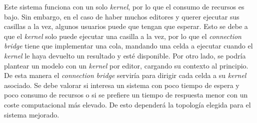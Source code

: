 \documentclass[11pt,spanish,listoffigures]{tfgetsinf}
\begin{document}
Este sistema funciona con un solo \textit{kernel}, por lo que el consumo de recursos es bajo. Sin embargo, en el caso de haber muchos editores y querer ejecutar sus casillas a la vez, algunos usuarios puede que tengan que esperar. Esto se debe a que el \textit{kernel} solo puede ejecutar una casilla a la vez, por lo que el \textit{connection bridge} tiene que implementar una cola, mandando una celda a ejecutar cuando el \textit{kernel} le haya devuelto un resultado y esté disponible. Por otro lado, se podría plantear un modelo con un \textit{kernel} por editor, cargando su contexto al principio. De esta manera el \textit{connection bridge} serviría para dirigir cada celda a su \textit{kernel} asociado. Se debe valorar si interesa un sistema con poco tiempo de espera y poco consumo de recursos o si se prefiere un tiempo de respuesta menor con un coste computacional más elevado. De esto dependerá la topología elegida para el sistema mejorado.



\printglossary[title=Glosario]



\end{document}
